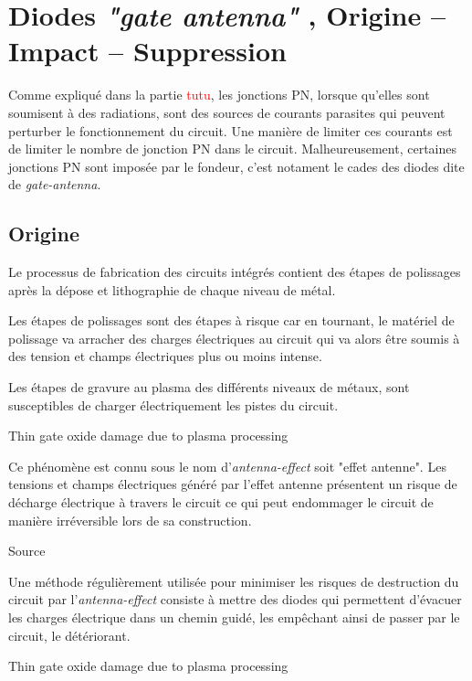 
\section{Diodes \textit{"gate antenna"} , Origine – Impact – Suppression}

Comme expliqué dans la partie \textcolor{red}{tutu}, les jonctions PN, lorsque qu'elles sont soumisent à des radiations, sont des sources de courants parasites qui peuvent perturber le fonctionnement du circuit. Une manière de limiter ces courants est de limiter le nombre de jonction PN dans le circuit. Malheureusement, certaines jonctions PN sont imposée par le fondeur, c'est notament le cades des diodes dite de \textit{gate-antenna}.

\subsection{Origine}
\begin{metsUneSource}
  Le processus de fabrication des circuits intégrés contient des étapes de polissages après la dépose et lithographie de chaque niveau de métal.
\end{metsUneSource}


\begin{metsUneSource}
  Les étapes de polissages sont des étapes à risque car en tournant, le matériel de polissage va arracher des charges électriques au circuit qui va alors être soumis à des tension et champs électriques plus ou moins intense.
\end{metsUneSource}
Les étapes de gravure au plasma des différents niveaux de métaux, sont susceptibles de charger électriquement les pistes du circuit.

\begin{metsUneSource}
Thin gate oxide damage due to plasma processing
\end{metsUneSource}

Ce phénomène est connu sous le nom d'\textit{antenna-effect} soit "effet antenne". Les tensions et champs électriques généré par l'effet antenne présentent un risque de décharge électrique à travers le circuit ce qui peut endommager le circuit de manière irréversible lors de sa construction.

\begin{metsUneSource}
Source 
\end{metsUneSource}


Une méthode régulièrement utilisée pour minimiser les risques de destruction du circuit par l'\textit{antenna-effect} consiste à mettre des diodes qui permettent d’évacuer les charges électrique dans un chemin guidé, les empêchant ainsi de passer par le circuit, le détériorant.
\begin{metsUneSource}
  Thin gate oxide damage due to plasma processing
\end{metsUneSource}

